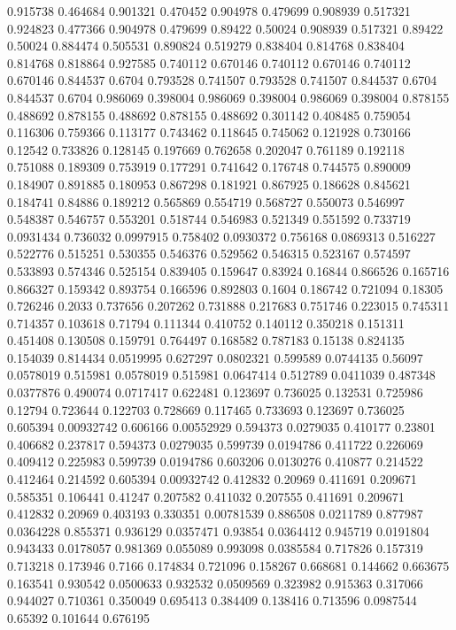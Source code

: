 0.915738 0.464684
0.901321 0.470452
0.904978 0.479699
0.908939 0.517321
0.924823 0.477366
0.904978 0.479699
0.89422 0.50024
0.908939 0.517321
0.89422 0.50024
0.884474 0.505531
0.890824 0.519279
0.838404 0.814768
0.838404 0.814768
0.818864 0.927585
0.740112 0.670146
0.740112 0.670146
0.740112 0.670146
0.844537 0.6704
0.793528 0.741507
0.793528 0.741507
0.844537 0.6704
0.844537 0.6704
0.986069 0.398004
0.986069 0.398004
0.986069 0.398004
0.878155 0.488692
0.878155 0.488692
0.878155 0.488692
0.301142 0.408485
0.759054 0.116306
0.759366 0.113177
0.743462 0.118645
0.745062 0.121928
0.730166 0.12542
0.733826 0.128145
0.197669 0.762658
0.202047 0.761189
0.192118 0.751088
0.189309 0.753919
0.177291 0.741642
0.176748 0.744575
0.890009 0.184907
0.891885 0.180953
0.867298 0.181921
0.867925 0.186628
0.845621 0.184741
0.84886 0.189212
0.565869 0.554719
0.568727 0.550073
0.546997 0.548387
0.546757 0.553201
0.518744 0.546983
0.521349 0.551592
0.733719 0.0931434
0.736032 0.0997915
0.758402 0.0930372
0.756168 0.0869313
0.516227 0.522776
0.515251 0.530355
0.546376 0.529562
0.546315 0.523167
0.574597 0.533893
0.574346 0.525154
0.839405 0.159647
0.83924 0.16844
0.866526 0.165716
0.866327 0.159342
0.893754 0.166596
0.892803 0.1604
0.186742 0.721094
0.18305 0.726246
0.2033 0.737656
0.207262 0.731888
0.217683 0.751746
0.223015 0.745311
0.714357 0.103618
0.71794 0.111344
0.410752 0.140112
0.350218 0.151311
0.451408 0.130508
0.159791 0.764497
0.168582 0.787183
0.15138 0.824135
0.154039 0.814434
0.0519995 0.627297
0.0802321 0.599589
0.0744135 0.56097
0.0578019 0.515981
0.0578019 0.515981
0.0647414 0.512789
0.0411039 0.487348
0.0377876 0.490074
0.0717417 0.622481
0.123697 0.736025
0.132531 0.725986
0.12794 0.723644
0.122703 0.728669
0.117465 0.733693
0.123697 0.736025
0.605394 0.00932742
0.606166 0.00552929
0.594373 0.0279035
0.410177 0.23801
0.406682 0.237817
0.594373 0.0279035
0.599739 0.0194786
0.411722 0.226069
0.409412 0.225983
0.599739 0.0194786
0.603206 0.0130276
0.410877 0.214522
0.412464 0.214592
0.605394 0.00932742
0.412832 0.20969
0.411691 0.209671
0.585351 0.106441
0.41247 0.207582
0.411032 0.207555
0.411691 0.209671
0.412832 0.20969
0.403193 0.330351
0.00781539 0.886508
0.0211789 0.877987
0.0364228 0.855371
0.936129 0.0357471
0.93854 0.0364412
0.945719 0.0191804
0.943433 0.0178057
0.981369 0.055089
0.993098 0.0385584
0.717826 0.157319
0.713218 0.173946
0.7166 0.174834
0.721096 0.158267
0.668681 0.144662
0.663675 0.163541
0.930542 0.0500633
0.932532 0.0509569
0.323982 0.915363
0.317066 0.944027
0.710361 0.350049
0.695413 0.384409
0.138416 0.713596
0.0987544 0.65392
0.101644 0.676195
